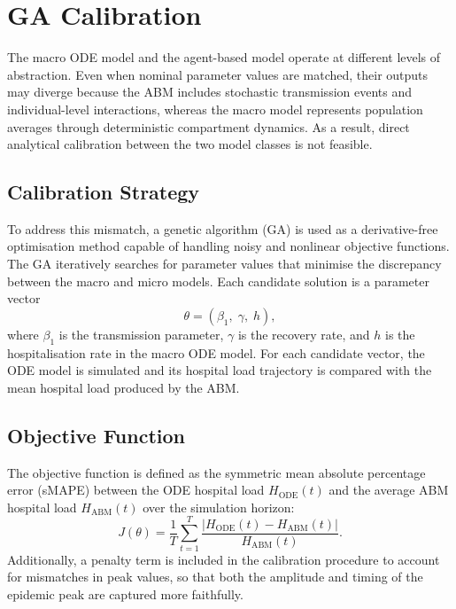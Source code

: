 \section{GA Calibration}
\label{sec:ga_calib}

The macro ODE model and the agent-based model operate at different levels of abstraction.
Even when nominal parameter values are matched, their outputs may diverge because the ABM includes stochastic transmission events and individual-level interactions, whereas the macro model represents population averages through deterministic compartment dynamics.
As a result, direct analytical calibration between the two model classes is not feasible.

\subsection{Calibration Strategy}
\label{sec:ga_strategy}

To address this mismatch, a genetic algorithm (GA) is used as a derivative-free optimisation method capable of handling noisy and nonlinear objective functions.
The GA iteratively searches for parameter values that minimise the discrepancy between the macro and micro models.
Each candidate solution is a parameter vector
\begin{equation}
  \theta = (\beta_1,\; \gamma,\; h),
\end{equation}
where $\beta_1$ is the transmission parameter, $\gamma$ is the recovery rate, and $h$ is the hospitalisation rate in the macro ODE model.
For each candidate vector, the ODE model is simulated and its hospital load trajectory is compared with the mean hospital load produced by the ABM.

\subsection{Objective Function}
\label{sec:ga_objective}

The objective function is defined as the symmetric mean absolute percentage error (sMAPE) between the ODE hospital load $H_{\mathrm{ODE}}(t)$ and the average ABM hospital load $H_{\mathrm{ABM}}(t)$ over the simulation horizon:
\begin{equation}
  J(\theta) = \frac{1}{T} \sum_{t=1}^{T} \frac{|H_{\mathrm{ODE}}(t) - H_{\mathrm{ABM}}(t)|}{H_{\mathrm{ABM}}(t)}.
  \label{eq:mape}
\end{equation}
Additionally, a penalty term is included in the calibration procedure to account for mismatches in peak values, so that both the amplitude and timing of the epidemic peak are captured more faithfully.

